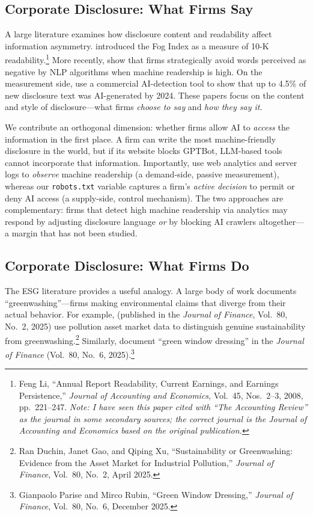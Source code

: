 \documentclass[12pt,a4paper]{article}
\begin{document}
\subsection{Corporate Disclosure: What Firms Say}

A large literature examines how disclosure content and readability affect information asymmetry. \citet{Li2008} introduced the Fog Index as a measure of 10-K readability.\footnote{Feng Li, ``Annual Report Readability, Current Earnings, and Earnings Persistence,'' \emph{Journal of Accounting and Economics}, Vol.~45, Nos.~2--3, 2008, pp.~221--247. \textit{Note: I have seen this paper cited with ``The Accounting Review'' as the journal in some secondary sources; the correct journal is the Journal of Accounting and Economics based on the original publication.}} More recently, \citet{CaoJiangYangZhang2023} show that firms strategically avoid words perceived as negative by NLP algorithms when machine readership is high. On the measurement side, \citet{BlankespoorDeHaanLi2024} use a commercial AI-detection tool to show that up to 4.5\% of new disclosure text was AI-generated by 2024. These papers focus on the content and style of disclosure---what firms \emph{choose to say} and \emph{how they say it}.

We contribute an orthogonal dimension: whether firms allow AI to \emph{access} the information in the first place. A firm can write the most machine-friendly disclosure in the world, but if its website blocks GPTBot, LLM-based tools cannot incorporate that information. Importantly, \citet{CaoJiangYangZhang2023} use web analytics and server logs to \emph{observe} machine readership (a demand-side, passive measurement), whereas our \texttt{robots.txt} variable captures a firm's \emph{active decision} to permit or deny AI access (a supply-side, control mechanism). The two approaches are complementary: firms that detect high machine readership via analytics may respond by adjusting disclosure language \citep{CaoJiangYangZhang2023} \emph{or} by blocking AI crawlers altogether---a margin that has not been studied.

\subsection{Corporate Disclosure: What Firms Do}

The ESG literature provides a useful analogy. A large body of work documents ``greenwashing''---firms making environmental claims that diverge from their actual behavior. For example, \citet{DuchinGaoXu2025} (published in the \emph{Journal of Finance}, Vol.~80, No.~2, 2025) use pollution asset market data to distinguish genuine sustainability from greenwashing.\footnote{Ran Duchin, Janet Gao, and Qiping Xu, ``Sustainability or Greenwashing: Evidence from the Asset Market for Industrial Pollution,'' \emph{Journal of Finance}, Vol.~80, No.~2, April 2025.} Similarly, \citet{PariseRubin2025} document ``green window dressing'' in the \emph{Journal of Finance} (Vol.~80, No.~6, 2025).\footnote{Gianpaolo Parise and Mirco Rubin, ``Green Window Dressing,'' \emph{Journal of Finance}, Vol.~80, No.~6, December 2025.}
\end{document}
